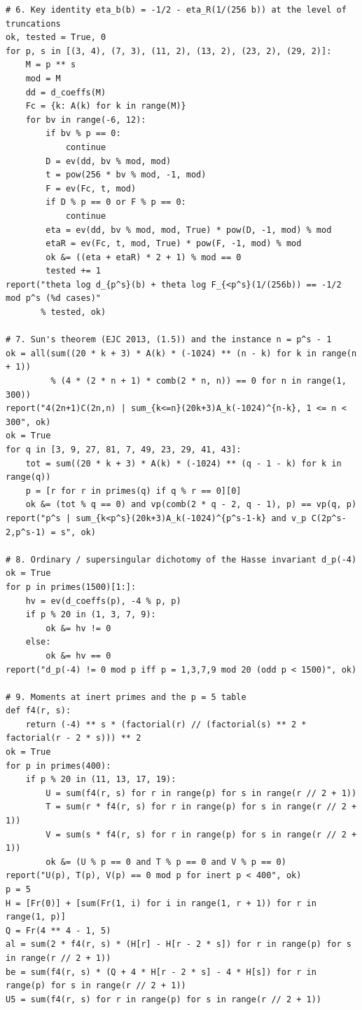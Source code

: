 \documentclass[11pt]{amsart}
\theoremstyle{definition}
\theoremstyle{remark}
\begin{document}
\begin{lstlisting}
# 6. Key identity eta_b(b) = -1/2 - eta_R(1/(256 b)) at the level of truncations
ok, tested = True, 0
for p, s in [(3, 4), (7, 3), (11, 2), (13, 2), (23, 2), (29, 2)]:
    M = p ** s
    mod = M
    dd = d_coeffs(M)
    Fc = {k: A(k) for k in range(M)}
    for bv in range(-6, 12):
        if bv % p == 0:
            continue
        D = ev(dd, bv % mod, mod)
        t = pow(256 * bv % mod, -1, mod)
        F = ev(Fc, t, mod)
        if D % p == 0 or F % p == 0:
            continue
        eta = ev(dd, bv % mod, mod, True) * pow(D, -1, mod) % mod
        etaR = ev(Fc, t, mod, True) * pow(F, -1, mod) % mod
        ok &= ((eta + etaR) * 2 + 1) % mod == 0
        tested += 1
report("theta log d_{p^s}(b) + theta log F_{<p^s}(1/(256b)) == -1/2 mod p^s (%d cases)"
       % tested, ok)

# 7. Sun's theorem (EJC 2013, (1.5)) and the instance n = p^s - 1
ok = all(sum((20 * k + 3) * A(k) * (-1024) ** (n - k) for k in range(n + 1))
         % (4 * (2 * n + 1) * comb(2 * n, n)) == 0 for n in range(1, 300))
report("4(2n+1)C(2n,n) | sum_{k<=n}(20k+3)A_k(-1024)^{n-k}, 1 <= n < 300", ok)
ok = True
for q in [3, 9, 27, 81, 7, 49, 23, 29, 41, 43]:
    tot = sum((20 * k + 3) * A(k) * (-1024) ** (q - 1 - k) for k in range(q))
    p = [r for r in primes(q) if q % r == 0][0]
    ok &= (tot % q == 0) and vp(comb(2 * q - 2, q - 1), p) == vp(q, p)
report("p^s | sum_{k<p^s}(20k+3)A_k(-1024)^{p^s-1-k} and v_p C(2p^s-2,p^s-1) = s", ok)

# 8. Ordinary / supersingular dichotomy of the Hasse invariant d_p(-4)
ok = True
for p in primes(1500)[1:]:
    hv = ev(d_coeffs(p), -4 % p, p)
    if p % 20 in (1, 3, 7, 9):
        ok &= hv != 0
    else:
        ok &= hv == 0
report("d_p(-4) != 0 mod p iff p = 1,3,7,9 mod 20 (odd p < 1500)", ok)

# 9. Moments at inert primes and the p = 5 table
def f4(r, s):
    return (-4) ** s * (factorial(r) // (factorial(s) ** 2 * factorial(r - 2 * s))) ** 2
ok = True
for p in primes(400):
    if p % 20 in (11, 13, 17, 19):
        U = sum(f4(r, s) for r in range(p) for s in range(r // 2 + 1))
        T = sum(r * f4(r, s) for r in range(p) for s in range(r // 2 + 1))
        V = sum(s * f4(r, s) for r in range(p) for s in range(r // 2 + 1))
        ok &= (U % p == 0 and T % p == 0 and V % p == 0)
report("U(p), T(p), V(p) == 0 mod p for inert p < 400", ok)
p = 5
H = [Fr(0)] + [sum(Fr(1, i) for i in range(1, r + 1)) for r in range(1, p)]
Q = Fr(4 ** 4 - 1, 5)
al = sum(2 * f4(r, s) * (H[r] - H[r - 2 * s]) for r in range(p) for s in range(r // 2 + 1))
be = sum(f4(r, s) * (Q + 4 * H[r - 2 * s] - 4 * H[s]) for r in range(p) for s in range(r // 2 + 1))
U5 = sum(f4(r, s) for r in range(p) for s in range(r // 2 + 1))



\end{lstlisting}
\end{document}
